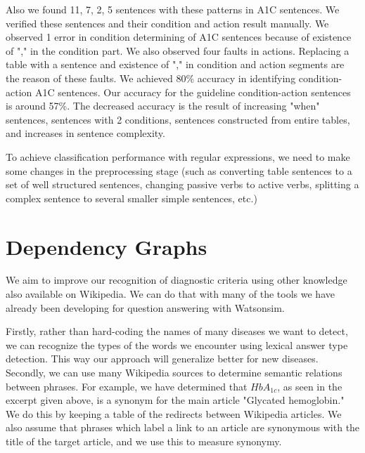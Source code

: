 \documentclass[12pt,letterpaper]{article}
\begin{document}
Also we found 11, 7, 2, 5 sentences with these patterns in A1C sentences. We verified these sentences and their condition and action result manually. We observed 1 error in condition determining of A1C sentences because of existence of "," in the condition part. We also observed four faults in actions. Replacing a table with a sentence and existence of "," in condition and action segments are the reason of these faults. We achieved 80\% accuracy in identifying condition-action A1C sentences. Our accuracy for the guideline condition-action sentences is around 57\%. The decreased accuracy is the result of increasing "when" sentences, sentences with 2 conditions, sentences constructed from entire tables, and increases in sentence complexity.

To achieve classification performance with regular expressions, we need to make some changes in the preprocessing stage (such as converting table sentences to a set of well structured sentences, changing passive verbs to active verbs, splitting a complex sentence to several smaller simple sentences, etc.)

\section{Dependency Graphs}
We aim to improve our recognition of diagnostic criteria using other knowledge also available on Wikipedia. We can do that with many of the tools we have already been developing for question answering with Watsonsim.

Firstly, rather than hard-coding the names of many diseases we want to detect, we can recognize the types of the words we encounter using lexical answer type detection. This way our approach will generalize better for new diseases.
Secondly, we can use many Wikipedia sources to determine semantic relations between phrases. For example, we have determined that $HbA_{1c}$, as seen in the excerpt given above, is a synonym for the main article "Glycated hemoglobin." We do this by keeping a table of the redirects between Wikipedia articles. We also assume that phrases which label a link to an article are synonymous with the title of the target article, and we use this to measure synonymy.
\end{document}
